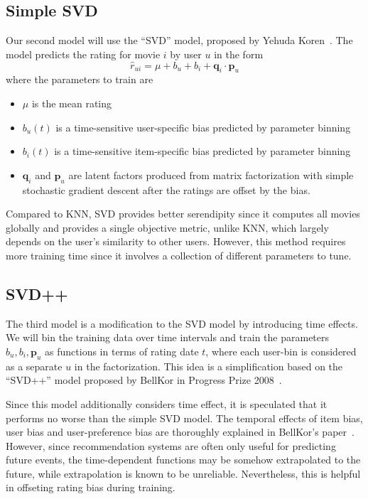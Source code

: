 \documentclass[final]{cvpr}
\newcommand{\q}[1]{\enquote{#1}}
\begin{document}
\subsection{Simple SVD}
Our second model will use the \q{SVD} model,
proposed by Yehuda Koren~\cite{CollabFiltering}.
The model predicts the rating for movie $i$ by user $u$ in the form
$$ \hat r_{ui} = \mu + b_u + b_i + \mathbf q_i \cdot \mathbf p_u $$
where the parameters to train are \begin{itemize}
	\item $\mu$ is the mean rating
	\item $b_u(t)$ is a time-sensitive user-specific bias predicted by parameter binning
	\item $b_i(t)$ is a time-sensitive item-specific bias predicted by parameter binning
	\item $\mathbf q_i$ and $\mathbf p_u$ are latent factors
		produced from matrix factorization with simple stochastic gradient descent
		after the ratings are offset by the bias.
\end{itemize}

Compared to KNN, SVD provides better serendipity
since it computes all movies globally and provides a single objective metric,
unlike KNN, which largely depends on the user's similarity to other users.
However, this method requires more training time
since it involves a collection of different parameters to tune.

\subsection{SVD++}
The third model is a modification to the SVD model
by introducing time effects.
We will bin the training data over time intervals
and train the parameters $b_u, b_i, \mathbf p_u$ as functions in terms of rating date $t$,
where each user-bin is considered as a separate $u$ in the factorization.
This idea is a simplification based on the \q{SVD++} model
proposed by BellKor in Progress Prize 2008~\cite{BellKor2008}.

Since this model additionally considers time effect,
it is speculated that it performs no worse than the simple SVD model.
The temporal effects of item bias, user bias and user-preference bias
are thoroughly explained in BellKor's paper~\cite{BellKor2008}.
However, since recommendation systems are often only useful for predicting future events,
the time-dependent functions may be somehow extrapolated to the future,
while extrapolation is known to be unreliable.
Nevertheless, this is helpful in offseting rating bias during training.

{\small
	
	
}
\end{document}
